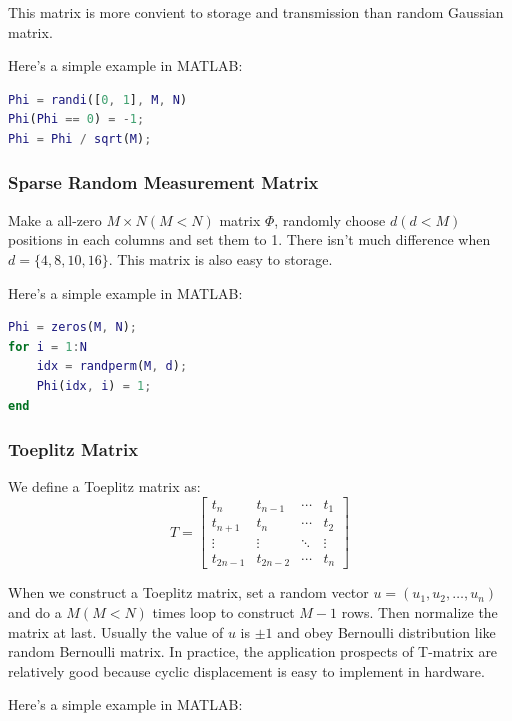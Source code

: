 \documentclass[12pt]{ctexart}
\begin{document}
This matrix is more convient to storage and transmission than random Gaussian matrix.

Here's a simple example in MATLAB:

\begin{lstlisting}[language=Matlab]
%% Random Bernoulli Matrix Example
Phi = randi([0, 1], M, N)
Phi(Phi == 0) = -1;
Phi = Phi / sqrt(M);
\end{lstlisting}

\subsubsection{\textbf{Sparse Random Measurement Matrix}}

Make a all-zero $M \times N (M < N)$ matrix $\Phi$, randomly choose $d (d < M)$ positions in each
columns and set them to 1. There isn't much difference when $d = \{4, 8, 10, 16\}$. This matrix
is also easy to storage.

Here's a simple example in MATLAB:

\begin{lstlisting}[language=Matlab]
%% Sparse Random Measurement Matrix Example
Phi = zeros(M, N);
for i = 1:N
    idx = randperm(M, d);
    Phi(idx, i) = 1;
end
\end{lstlisting}

\subsubsection{\textbf{Toeplitz Matrix}}

We define a Toeplitz matrix as:
\[
  T = \begin{bmatrix}
    t_n & t_{n-1} & \cdots & t_1 \\
    t_{n+1} & t_n & \cdots & t_2 \\
    \vdots & \vdots & \ddots & \vdots \\
    t_{2n-1} & t_{2n-2} & \cdots & t_n
  \end{bmatrix}
\]

When we construct a Toeplitz matrix, set a random vector $u = (u_1, u_2, \ldots, u_n)$ and
do a $M (M < N)$ times loop to construct $M-1$ rows. Then normalize the matrix at last.
Usually the value of $u$ is $\pm 1$ and obey Bernoulli distribution like random Bernoulli
matrix. In practice, the application prospects of T-matrix are relatively good because
cyclic displacement is easy to implement in hardware.

Here's a simple example in MATLAB:
\end{document}
